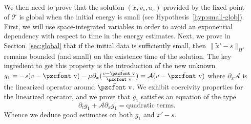 \documentclass[10pt]{amsart}
\theoremstyle{definition}\newtheorem{defi}[theo]{Definition}\newtheorem{rema}[theo]{Remark}\newtheorem{exam}[theo]{Example}\newtheorem{exem}[theo]{Example}\newtheorem{nota}[theo]{Notation}
\newcommand{\mathpzc}[1]{\text{\pzcfont #1}}
\newcommand{\p}{\partial}
\newcommand{\bv}{\bar{\mathpzc{v}}}
\newcommand{\cA}{\mathcal A}
\newcommand{\cT}{\mathcal T}
\newcommand{\tx}{\widetilde{x}}
\begin{document}
We then need to prove that the solution $(\tx, v_s, u_s)$ provided by the fixed point of $\cT$ is global when the initial energy is small (see Hypothesis~\eqref{hyp:small-glob}). First, we will use space-integrated variables in order to avoid an exponential dependency with respect to time in the energy estimates. Next, we prove in Section~\ref{sec:global} that if the initial data is sufficiently small, then $\|\tx'-s\|_{H^1}$ remains bounded (and small) on the existence time of the solution. The key ingredient to get this property is the introduction of the new unknown $g_1 = -s (v-\bv) - \mu \partial_x (\frac{v-\bv}{\bv}) = \cA(v-\bv)$ where $\partial_x \cA$ is the linearized operator around $\bv$. We exhibit coercivity properties for the linearized operator, and we prove that $g_1$ satisfies an equation of the type
\[
\p_t g_1 + \cA\p_x g_1=\text{quadratic terms}.
\]
Whence we deduce good estimates on both $g_1$ and $\tx'-s$.
\end{document}
